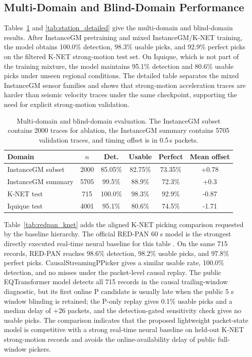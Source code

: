 \documentclass[journal]{IEEEtran}
\newcommand{\modelv}{CausalStreamingPPicker\xspace}
\newcommand{\chunk}{0.5\,s\xspace}
\newcommand{\tgrstablesetup}{\small\setlength{\tabcolsep}{2.6pt}\renewcommand{\arraystretch}{1.08}}
\begin{document}
\subsection{Multi-Domain and Blind-Domain Performance}
Tables~\ref{tab:domains} and \ref{tab:station_detailed} give the multi-domain and blind-domain results. After InstanceGM pretraining and mixed InstanceGM/K-NET training, the model obtains 100.0\% detection, 98.3\% usable picks, and 92.9\% perfect picks on the filtered K-NET strong-motion test set. On Iquique, which is not part of the training mixture, the model maintains 95.1\% detection and 80.6\% usable picks under unseen regional conditions. The detailed table separates the mixed InstanceGM sensor families and shows that strong-motion acceleration traces are harder than seismic velocity traces under the same checkpoint, supporting the need for explicit strong-motion validation.

\begin{table}[!t]
\centering
\caption{Multi-domain and blind-domain evaluation. The InstanceGM subset contains 2000 traces for ablation, the InstanceGM summary contains 5705 validation traces, and timing offset is in \chunk packets.}
\label{tab:domains}
{\tgrstablesetup
\begin{tabular}{@{}lccccc@{}}
\toprule
Domain & $n$ & Det. & Usable & Perfect & Mean offset\\
\midrule
InstanceGM subset & 2000 & 85.05\% & 82.75\% & 73.35\% & +0.78\\
InstanceGM summary & 5705 & 99.5\% & 88.9\% & 72.3\% & +0.3\\
K-NET test & 715 & 100.0\% & 98.3\% & 92.9\% & -0.87\\
Iquique test & 4001 & 95.1\% & 80.6\% & 74.5\% & -1.71\\
\bottomrule
\end{tabular}}
\end{table}



Table~\ref{tab:redpan_knet} adds the aligned K-NET picking comparison requested by the baseline hierarchy. The official RED-PAN 60 s model is the strongest directly executed real-time neural baseline for this table \cite{liao2022redpan}. On the same 715 records, RED-PAN reaches 98.6\% detection, 98.2\% usable picks, and 97.8\% perfect picks. \modelv{} gives a similar usable rate, 100.0\% detection, and no misses under the packet-level causal replay. The public EQTransformer model detects all 715 records in the causal trailing-window diagnostic, but its first online P candidate is usually late when the public 5 s window blinding is retained; the P-only replay gives 0.1\% usable picks and a median delay of +26 packets, and the detection-gated sensitivity check gives no usable picks. The comparison indicates that the proposed lightweight packet-state model is competitive with a strong real-time neural baseline on held-out K-NET strong-motion records and avoids the online-availability delay of public full-window pickers.
\end{document}
